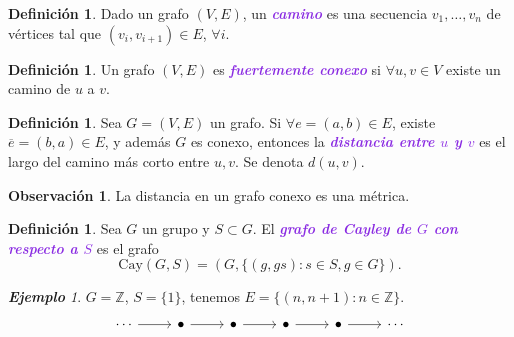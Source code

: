 \documentclass{article}
\theoremstyle{definition}
\newtheorem{definition}[theorem]{Definición}
\newtheorem*{obs}{Observación}
\theoremstyle{remark}
\newtheorem{example}[theorem]{\textbf{Ejemplo}}
\numberwithin{equation}{section}
\newcommand{\Z}{\mathbb{Z}}
\renewcommand{\bar}{\overline}
\newcommand{\Cay}{\mathrm{Cay}}
\newcommand{\wea}[1]{\textcolor{BlueViolet}{\textbf{\emph{#1}}}}
\begin{document}
\begin{definition}
  Dado un grafo $(V,E)$, un \wea{camino} es una secuencia $v_1,\dots,v_n$ de vértices tal que $(v_i,v_{i+1}) \in E$, $\forall i$.
\end{definition}

\begin{definition}
  Un grafo $(V,E)$ es \wea{fuertemente conexo} si $\forall u,v \in V$ existe un camino de $u$ a $v$.
\end{definition}

\begin{definition}
  Sea $G = (V,E)$ un grafo. Si $\forall e = (a,b) \in E$, existe $\bar e = (b,a) \in E$, y además $G$ es conexo, entonces la \wea{distancia entre $u$ y $v$} es el largo del camino más corto entre $u,v$. Se denota $d(u,v)$.
\end{definition}

\begin{obs}
  La distancia en un grafo conexo es una métrica.
\end{obs}

\begin{definition}
  Sea $G$ un grupo y $S \subset G$. El \wea{grafo de Cayley de $G$ con respecto a $S$} es el grafo
  \[\Cay(G,S) = (G,\{(g,gs) \colon s \in S , g \in G\}).\]
\end{definition}

\begin{example}
  $G = \Z$, $S=\{1\}$, tenemos $E = \{(n,n+1) \colon n \in \Z\}$.
  \[\begin{tikzcd}
    \cdots & \bullet & \bullet & \bullet & \bullet & \cdots
    \arrow[from=1-1, to=1-2]
    \arrow[from=1-2, to=1-3]
    \arrow[from=1-3, to=1-4]
    \arrow[from=1-4, to=1-5]
    \arrow[from=1-5, to=1-6]
  \end{tikzcd}\]
\end{example}
\end{document}

